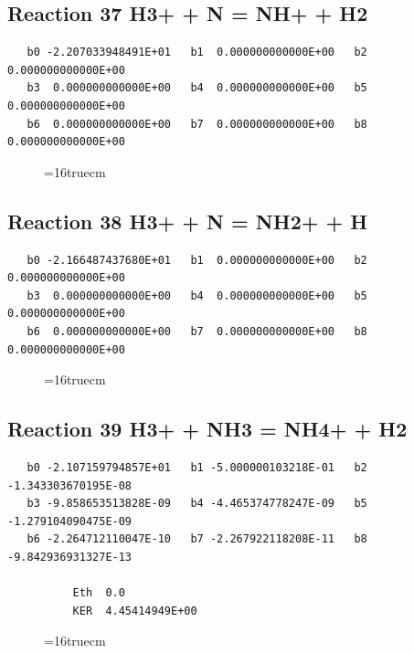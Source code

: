 \documentclass[12pt,dvipdfm]{article}
\begin{document}
\subsection{
Reaction 37 H3+ + N = NH+ + H2 }
\begin{small}\begin{verbatim}
   b0 -2.207033948491E+01   b1  0.000000000000E+00   b2  0.000000000000E+00
   b3  0.000000000000E+00   b4  0.000000000000E+00   b5  0.000000000000E+00
   b6  0.000000000000E+00   b7  0.000000000000E+00   b8  0.000000000000E+00
\end{verbatim}\end{small}
\begin{figure}[h!] \label{n2rates}
\epsfxsize=16truecm
\end{figure}
\newpage

\subsection{
Reaction 38 H3+ + N = NH2+ + H }
\begin{small}\begin{verbatim}
   b0 -2.166487437680E+01   b1  0.000000000000E+00   b2  0.000000000000E+00
   b3  0.000000000000E+00   b4  0.000000000000E+00   b5  0.000000000000E+00
   b6  0.000000000000E+00   b7  0.000000000000E+00   b8  0.000000000000E+00
\end{verbatim}\end{small}
\begin{figure}[h!] \label{n2rates}
\epsfxsize=16truecm
\end{figure}
\newpage

\subsection{
Reaction 39 H3+ + NH3 = NH4+ + H2 }
\begin{small}\begin{verbatim}
   b0 -2.107159794857E+01   b1 -5.000000103218E-01   b2 -1.343303670195E-08
   b3 -9.858653513828E-09   b4 -4.465374778247E-09   b5 -1.279104090475E-09
   b6 -2.264712110047E-10   b7 -2.267922118208E-11   b8 -9.842936931327E-13

          Eth  0.0
          KER  4.45414949E+00
\end{verbatim}\end{small}
\begin{figure}[h!] \label{n2rates}
\epsfxsize=16truecm
\end{figure}
\newpage
\end{document}
